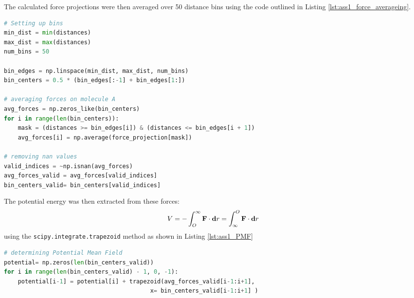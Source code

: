 \documentclass[10pt,a4paper]{labreport}
\begin{document}
The calculated force projections were then averaged over 50 distance bins using the code outlined in Listing \ref{lst:ass1_force_averageing}.
\begin{lstlisting}[language=Python,
                   label=lst:ass1_force_averageing,
                   caption={The python code used to average out the force projections }
                  ]
# Setting up bins
min_dist = min(distances)
max_dist = max(distances)
num_bins = 50

bin_edges = np.linspace(min_dist, max_dist, num_bins)
bin_centers = 0.5 * (bin_edges[:-1] + bin_edges[1:])

# averaging forces on molecule A
avg_forces = np.zeros_like(bin_centers)
for i in range(len(bin_centers)):
    mask = (distances >= bin_edges[i]) & (distances <= bin_edges[i + 1])
    avg_forces[i] = np.average(force_projection[mask])

# removing nan values
valid_indices = ~np.isnan(avg_forces)
avg_forces_valid = avg_forces[valid_indices]
bin_centers_valid= bin_centers[valid_indices]
\end{lstlisting}
The potential energy was then extracted from these forces:
\begin{equation}
  V = - \int_O^\infty \vb{F} \cdot \vb{d}r = \int_\infty^O \vb{F} \cdot \vb{d}r
\end{equation}
using the \texttt{scipy.integrate.trapezoid} method as shown in Listing \ref{lst:ass1_PMF}
\begin{lstlisting}[language=Python,
                   label=lst:ass1_PMF,
                   caption={The python code used to determine the PFM. Integration starts from larger distances to smaller to allow for complete integration of the forces. Actual itegration is achieved using the \texttt{scipy.integrate.trapezoid} function.}
                  ]
# determining Potential Mean Field 
potential= np.zeros(len(bin_centers_valid))
for i in range(len(bin_centers_valid) - 1, 0, -1):
    potential[i-1] = potential[i] + trapezoid(avg_forces_valid[i-1:i+1], 
                                          x= bin_centers_valid[i-1:i+1] )
\end{lstlisting}
\end{document}
